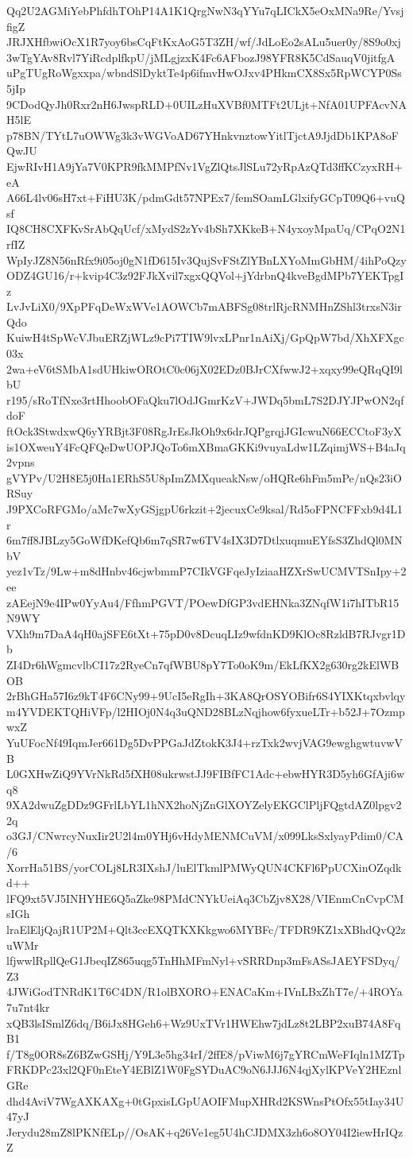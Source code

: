 Qq2U2AGMiYebPhfdhTOhP14A1K1QrgNwN3qYYu7qLICkX5eOxMNa9Re/YvsjfigZ
JRJXHfbwiOcX1R7yoy6bsCqFtKxAoG5T3ZH/wf/JdLoEo2sALu5uer0y/8S9o0xj
3wTgYAv8Rvl7YiRcdplfkpU/jMLgjzxK4Fc6AFbozJ98YFR8K5CdSauqV0jitfgA
uPgTUgRoWgxxpa/wbndSlDyktTe4p6ifmvHwOJxv4PHkmCX8Sx5RpWCYP0Ss5jIp
9CDodQyJh0Rxr2nH6JwspRLD+0UILzHuXVBf0MTFt2ULjt+NfA01UPFAcvNAH5lE
p78BN/TYtL7uOWWg3k3vWGVoAD67YHnkvnztowYitlTjctA9JjdDb1KPA8oFQwJU
EjwRIvH1A9jYa7V0KPR9fkMMPfNv1VgZlQtsJlSLu72yRpAzQTd3ffKCzyxRH+eA
A66L4lv06sH7xt+FiHU3K/pdmGdt57NPEx7/femSOamLGlxifyGCpT09Q6+vuQsf
IQ8CH8CXFKvSrAbQqUcf/xMydS2zYv4bSh7XKkeB+N4yxoyMpaUq/CPqO2N1rfIZ
WpIyJZ8N56nRfx9i05oj0gN1fD615Iv3QujSvFStZlYBnLXYoMmGbHM/4ihPoQzy
ODZ4GU16/r+kvip4C3z92FJkXvil7xgxQQVol+jYdrbnQ4kveBgdMPb7YEKTpgIz
LvJvLiX0/9XpPFqDeWxWVe1AOWCb7mABFSg08trlRjcRNMHnZShl3trxsN3irQdo
KuiwH4tSpWcVJbuERZjWLz9cPi7TIW9lvxLPnr1nAiXj/GpQpW7bd/XhXFXgc03x
2wa+eV6tSMbA1sdUHkiwOROtC0c06jX02EDz0BJrCXfwwJ2+xqxy99eQRqQI9lbU
r195/sRoTfNxe3rtHhoobOFaQku7lOdJGmrKzV+JWDq5bmL7S2DJYJPwON2qfdoF
ftOck3StwdxwQ6yYRBjt3F08RgJrEsJkOh9x6drJQPgrqjJGIcwuN66ECCtoF3yX
is1OXweuY4FcQFQeDwUOPJQoTo6mXBmaGKKi9vuyaLdw1LZqimjWS+B4aJq2vpns
gVYPv/U2H8E5j0Ha1ERhS5U8pImZMXqueakNsw/oHQRe6hFm5mPe/nQs23iORSuy
J9PXCoRFGMo/aMc7wXyGSjgpU6rkzit+2jecuxCe9ksal/Rd5oFPNCFFxb9d4L1r
6m7ff8JBLzy5GoWfDKefQb6m7qSR7w6TV4sIX3D7DtlxuqmuEYfsS3ZhdQl0MNbV
yez1vTz/9Lw+m8dHnbv46cjwbmmP7CIkVGFqeJyIziaaHZXrSwUCMVTSnIpy+2ee
zAEejN9e4IPw0YyAu4/FfhmPGVT/POewDfGP3vdEHNka3ZNqfW1i7hITbR15N9WY
VXh9m7DaA4qH0ajSFE6tXt+75pD0v8DcuqLIz9wfdnKD9KlOc8RzldB7RJvgr1Db
ZI4Dr6hWgmcvlbCI17z2RyeCn7qfWBU8pY7To0oK9m/EkLfKX2g630rg2kElWBOB
2rBhGHa57I6z9kT4F6CNy99+9UcI5eRgIh+3KA8QrOSYOBifr6S4YIXKtqxbvlqy
m4YVDEKTQHiVFp/l2HIOj0N4q3uQND28BLzNqjhow6fyxueLTr+b52J+7OzmpwxZ
YuUFocNf49IqmJer661Dg5DvPPGaJdZtokK3J4+rzTxk2wvjVAG9ewghgwtuvwVB
L0GXHwZiQ9YVrNkRd5fXH08ukrwstJJ9FIBfFC1Adc+ebwHYR3D5yh6GfAji6wq8
9XA2dwuZgDDz9GFrlLbYL1hNX2hoNjZnGlXOYZelyEKGClPljFQgtdAZ0lpgv22q
o3GJ/CNwrcyNuxIir2U2l4m0YHj6vHdyMENMCuVM/x099LksSxlyayPdim0/CA/6
XorrHa51BS/yorCOLj8LR3IXshJ/luElTkmlPMWyQUN4CKFl6PpUCXinOZqdkd++
lFQ9xt5VJ5INHYHE6Q5aZke98PMdCNYkUeiAq3CbZjv8X28/VIEnmCnCvpCMsIGh
lraElEljQajR1UP2M+Qlt3ccEXQTKXKkgwo6MYBFc/TFDR9KZ1xXBhdQvQ2zuWMr
lfjwwlRpllQeG1JbeqIZ865uqg5TnHhMFmNyl+vSRRDnp3mFsASsJAEYFSDyq/Z3
4JWiGodTNRdK1T6C4DN/R1olBXORO+ENACaKm+IVnLBxZhT7e/+4ROYa7u7nt4kr
xQB3lsISmlZ6dq/B6iJx8HGeh6+Wz9UxTVr1HWEhw7jdLz8t2LBP2xuB74A8FqB1
f/T8g0OR8sZ6BZwGSHj/Y9L3e5hg34rI/2ffE8/pViwM6j7gYRCmWeFIqln1MZTp
FRKDPc23xl2QF0nEteY4EBlZ1W0FgSYDuAC9oN6JJJ6N4qjXylKPVeY2HEznlGRe
dhd4AviV7WgAXKAXg+0tGpxisLGpUAOIFMupXHRd2KSWnsPtOfx55tIay34U47yJ
Jerydu28mZ8lPKNfELp//OsAK+q26Ve1eg5U4hCJDMX3zh6o8OY04I2iewHrIQzZ
